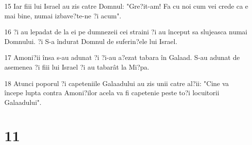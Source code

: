 \par 15 Iar fiii lui Israel au zis catre Domnul: "Gre?it-am! Fa cu noi cum vei crede ca e mai bine, numai izbave?te-ne ?i acum".
\par 16 ?i au lepadat de la ei pe dumnezeii cei straini ?i au început sa slujeasca numai Domnului. ?i S-a îndurat Domnul de suferin?ele lui Israel.
\par 17 Amoni?ii însa s-au adunat ?i ?i-au a?ezat tabara în Galaad. S-au adunat de asemenea ?i fiii lui Israel ?i au tabarât la Mi?pa.
\par 18 Atunci poporul ?i capeteniile Galaadului au zis unii catre al?ii: "Cine va începe lupta contra Amoni?ilor acela va fi capetenie peste to?i locuitorii Galaadului".

\chapter{11}

